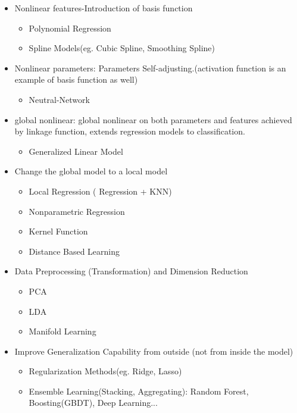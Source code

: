 \documentclass[11pt, openany]{book}              %
\begin{document}
 \begin{itemize}
 	\item Nonlinear features-Introduction of basis function
 	\begin{itemize}
    	\item Polynomial Regression
    	\item Spline Models(eg. Cubic Spline, Smoothing Spline)
	\end{itemize}
 	\item Nonlinear parameters: Parameters Self-adjusting.(activation function is an example of basis function as well)
 	 \begin{itemize}
    	\item Neutral-Network
	\end{itemize}
 	\item global nonlinear: global nonlinear on both parameters and features achieved by linkage function, extends regression models to classification.
 	 \begin{itemize}
    	\item Generalized Linear Model
	\end{itemize}
    \item Change the global model to a local model
   	\begin{itemize}
    	\item Local Regression ( Regression + KNN) 
    	\item Nonparametric Regression
    	\item Kernel Function 
    	\item Distance Based Learning
	\end{itemize}	
	\item Data Preprocessing (Transformation) and Dimension Reduction
   	\begin{itemize}
    	\item PCA
    	\item LDA
    	\item Manifold Learning
	\end{itemize}
	\item Improve Generalization Capability from outside (not from inside the model)
	\begin{itemize}
    	\item Regularization Methods(eg. Ridge, Lasso)
    	\item Ensemble Learning(Stacking, Aggregating): Random Forest, Boosting(GBDT), Deep Learning...
	\end{itemize}
 \end{itemize}
\end{document}
